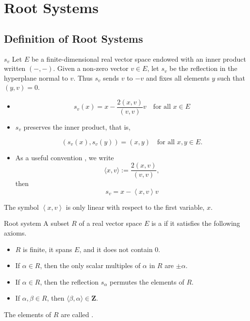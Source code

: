\documentclass[../main.tex]{subfiles}
\begin{document}
\ifSubfilesClassLoaded{

    
}{}

\chapter{ Root Systems }
\section{Definition of Root Systems}

\begin{definition}{\(  s_v  \) }{}
    Let \(E\) be a finite-dimensional real vector space endowed with an inner product written \((-, -)\). Given a non-zero vector \(v \in E\), let \(s_v\) be the reflection in the hyperplane normal to \(v\). Thus \(s_v\) sends \(v\) to \(-v\) and fixes all elements \(y\) such that \((y, v) = 0\). 
\end{definition}

\begin{proposition}{}{}

    \begin{itemize}
        \item 
\[
s_{v}(x)=x-\frac{2(x,v)}{(v,v)}v\quad\text{for all }x\in E
\]
\item \(s_{v}\) preserves the inner product, that is,

\[
(s_{v}(x),s_{v}(y))=(x,y)\quad\text{for all }x,y\in E.
\]
\item  As a useful convention , we write\[
\langle x,v\rangle:=\frac{2(x,v)}{(v,v)},
\] then \[
s_{v}= x-\left<x,v \right>v
\]


    \end{itemize}
    

\end{proposition}

\begin{remark}
    The symbol \(  \left<x,v \right>  \) is only linear with respect to the first variable, \(  x  \).  
\end{remark}

\begin{definition}{Root system}{}
A subset $R$ of a real vector space $E$ is a  if it satisfies the following axioms.
\begin{itemize}
  \item[(R1)] $R$ is finite, it spans $E$, and it does not contain $0$.
  \item[(R2)] If $\alpha \in R$, then the only scalar multiples of $\alpha$ in $R$ are $\pm \alpha$.
  \item[(R3)] If $\alpha \in R$, then the reflection $s_{\alpha}$ permutes the elements of $R$.
  \item[(R4)] If $\alpha, \beta \in R$, then $\langle \beta, \alpha \rangle \in \mathbf{Z}$.
\end{itemize}
The elements of $R$ are called .
\end{definition}
\end{document}
